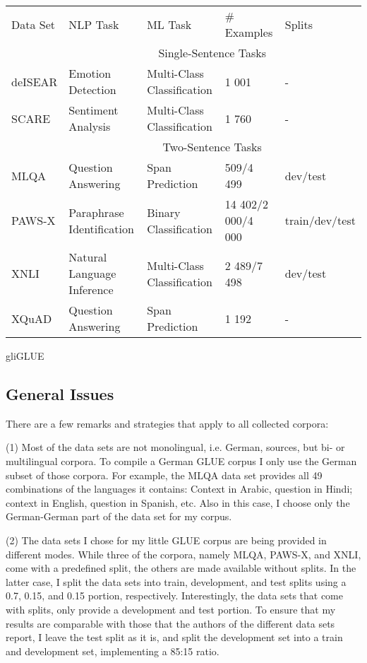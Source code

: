 {\begin{tabular}{l|llll}
	Data Set & NLP Task & ML Task & \# Examples & Splits \\
	\hhline{=|====}
	& \multicolumn{4}{c}{Single-Sentence Tasks} \\
	deISEAR &  Emotion Detection & Multi-Class Classification  & 1 001 & - \\
	SCARE & Sentiment Analysis & Multi-Class Classification & 1 760 & - \\
	\hline
	& \multicolumn{4}{c}{Two-Sentence Tasks} \\
	MLQA & Question Answering & Span Prediction & 509/4 499 & dev/test \\
	PAWS-X & Paraphrase Identification & Binary Classification & 14 402/2 000/4 000 & train/dev/test \\
	XNLI & Natural Language Inference & Multi-Class Classification &  2 489/7 498 & dev/test \\
	XQuAD & Question Answering & Span Prediction &  1 192 & - \\
\end{tabular}
}{gliGLUE}

\subsection{General Issues}

There are a few remarks and strategies that apply to all collected corpora:

(1) Most of the data sets are not monolingual, i.e. German, sources, but bi- or multilingual corpora.
To compile a German GLUE corpus I only use the German subset of those corpora.
For example, the MLQA data set provides all 49 combinations of the languages it contains:
Context in Arabic, question in Hindi; context in English, question in Spanish, etc.
Also in this case, I choose only the German-German part of the data set for my corpus.

(2) The data sets I chose for my little GLUE corpus are being provided in different modes.
While three of the corpora, namely MLQA, PAWS-X, and XNLI, come with a predefined split, the others are made available without splits.
In the latter case, I split the data sets into train, development, and test splits using a 0.7, 0.15, and 0.15 portion, respectively.
Interestingly, the data sets that come with splits, only provide a development and test portion.
To ensure that my results are comparable with those that the authors of the different data sets report, I leave the test split as it is, and split the development set into a train and development set, implementing a 85:15 ratio.

